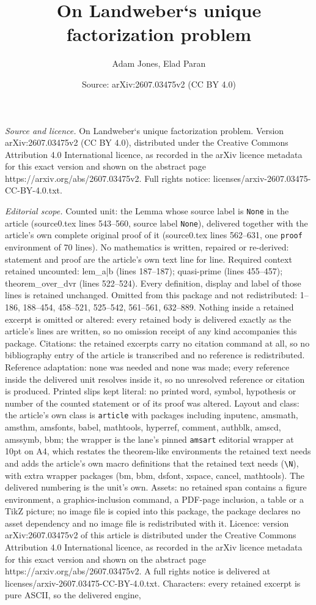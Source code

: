 \documentclass[10pt,a4paper]{amsart}
\title[On Landweber`s unique factorization problem]{On Landweber`s unique factorization problem}
\author{Adam Jones, Elad Paran}
\date{Source: arXiv:2607.03475v2 (CC BY 4.0)}
\begin{document}
\maketitle

\noindent\emph{Source and licence.} On Landweber`s unique factorization problem. Version arXiv:2607.03475v2 (CC BY 4.0), distributed under the Creative Commons Attribution 4.0 International licence, as recorded in the arXiv licence metadata for this exact version and shown on the abstract page https://arxiv.org/abs/2607.03475v2. Full rights notice: licenses/arxiv-2607.03475-CC-BY-4.0.txt.\par\smallskip

\noindent\textit{Editorial scope.} Counted unit: the Lemma whose source label is \texttt{None} in the article (source0.tex lines 543--560, source label \texttt{None}), delivered together with the article's own complete original proof of it (source0.tex lines 562--631, one \texttt{proof} environment of 70 lines). No mathematics is written, repaired or re-derived: statement and proof are the article's own text line for line. Required context retained uncounted: lem\_a|b (lines 187--187); quasi-prime (lines 455--457); theorem\_over\_dvr (lines 522--524). Every definition, display and label of those lines is retained unchanged. Omitted from this package and not redistributed: 1--186, 188--454, 458--521, 525--542, 561--561, 632--889. Nothing inside a retained excerpt is omitted or altered: every retained body is delivered exactly as the article's lines are written, so no omission receipt of any kind accompanies this package. Citations: the retained excerpts carry no citation command at all, so no bibliography entry of the article is transcribed and no reference is redistributed. Reference adaptation: none was needed and none was made; every reference inside the delivered unit resolves inside it, so no unresolved reference or citation is produced. Printed slips kept literal: no printed word, symbol, hypothesis or number of the counted statement or of its proof was altered. Layout and class: the article's own class is \texttt{article} with packages including inputenc, amsmath, amsthm, amsfonts, babel, mathtools, hyperref, comment, authblk, amscd, amssymb, bbm; the wrapper is the lane's pinned \texttt{amsart} editorial wrapper at 10pt on A4, which restates the theorem-like environments the retained text needs and adds the article's own macro definitions that the retained text needs (\texttt{\textbackslash N}), with extra wrapper packages (bm, bbm, dsfont, xspace, cancel, mathtools). The delivered numbering is the unit's own. Assets: no retained span contains a figure environment, a graphics-inclusion command, a PDF-page inclusion, a table or a TikZ picture; no image file is copied into this package, the package declares no asset dependency and no image file is redistributed with it. Licence: version arXiv:2607.03475v2 of this article is distributed under the Creative Commons Attribution 4.0 International licence, as recorded in the arXiv licence metadata for this exact version and shown on the abstract page https://arxiv.org/abs/2607.03475v2. A full rights notice is delivered at licenses/arxiv-2607.03475-CC-BY-4.0.txt. Characters: every retained excerpt is pure ASCII, so the delivered engine, 
\end{document}

